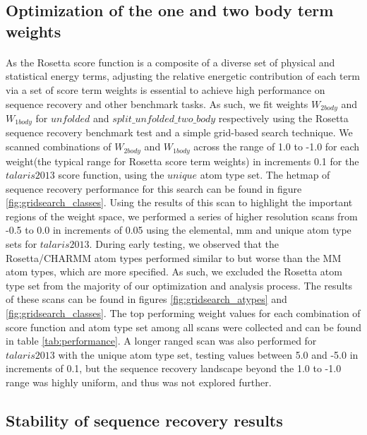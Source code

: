 \subsection{Optimization of the one and two body term weights}
\paragraph{}
As the Rosetta score function is a composite of a diverse set of physical and statistical energy terms, adjusting the relative energetic contribution of each term via a set of score term weights is essential to achieve high performance on sequence recovery and other benchmark tasks\cite{rohl_protein_2004,leaver-fay_chapter_2013}.
As such, we fit weights $W_{2body}$ and $W_{1body}$ for $unfolded$ and $split\_unfolded\_two\_body$ respectively using the Rosetta sequence recovery benchmark test\cite{leaver-fay_chapter_2013} and a simple grid-based search technique.
We scanned combinations of $W_{2body}$ and $W_{1body}$ across the range of 1.0 to -1.0 for each weight(the typical range for Rosetta score term weights) in increments 0.1 for the $talaris2013$ score function, using the $unique$ atom type set.
The hetmap of sequence recovery performance for this search can be found in figure \ref{fig:gridsearch_classes}.
Using the results of this scan to highlight the important regions of the weight space, we performed a series of higher resolution scans from -0.5 to 0.0 in increments of 0.05 using the elemental, mm and unique atom type sets for $talaris2013$.
During early testing, we observed that the Rosetta/CHARMM atom types performed similar to but worse than the MM atom types, which are more specified.
As such, we excluded the Rosetta atom type set from the majority of our optimization and analysis process.
The results of these scans can be found in figures \ref{fig:gridsearch_atypes} and \ref{fig:gridsearch_classes}.
The top performing weight values for each combination of score function and atom type set among all scans were collected and can be found in table \ref{tab:performance}.
A longer ranged scan was also performed for $talaris2013$ with the unique atom type set, testing values between 5.0 and -5.0 in increments of 0.1, but the sequence recovery landscape beyond the 1.0 to -1.0 range was highly uniform, and thus was not explored further.

\subsection{Stability of sequence recovery results}
